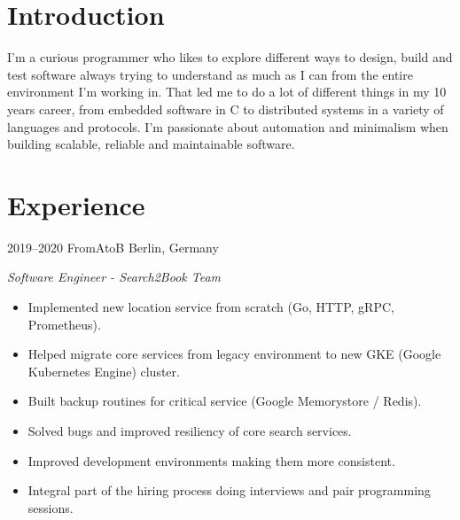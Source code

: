 \documentclass[]{friggeri-cv} %
\begin{document}

\section{Introduction}

\begin{entrylist}
\entry
{}
{}
{}
{
I'm a curious programmer who likes to explore different ways to design, build and test software
always trying to understand as much as I can from the entire environment I'm working in.
That led me to do a lot of different things in my 10 years career, from embedded
software in C to distributed systems in a variety of languages and protocols.
I'm passionate about automation and minimalism when building scalable, reliable
and maintainable software.
}
\end{entrylist}


\section{Experience}

\begin{entrylist}
\entry
{2019--2020}
{FromAtoB}
{Berlin, Germany}
{\emph{Software Engineer - Search2Book Team} \\

\begin{itemize}
  \item Implemented new location service from scratch (Go, HTTP, gRPC, Prometheus).
  \item Helped migrate core services from legacy environment to new GKE (Google Kubernetes Engine) cluster.
  \item Built backup routines for critical service (Google Memorystore / Redis).
  \item Solved bugs and improved resiliency of core search services.
  \item Improved development environments making them more consistent.
  \item Integral part of the hiring process doing interviews and pair programming sessions.
\end{itemize}

}
\end{entrylist}
\end{document}

